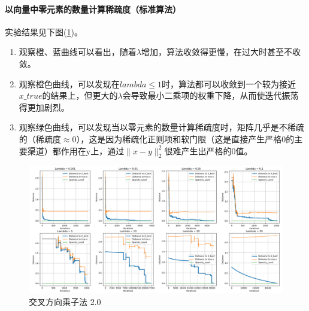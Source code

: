 \documentclass{article}
\begin{document}
\paragraph{以向量中零元素的数量计算稀疏度（标准算法）\\}
实验结果见下图(\ref{fig: img2.0})。\\
\begin{enumerate}
    \item 观察橙、蓝曲线可以看出，随着$\lambda$增加，算法收敛得更慢，在过大时甚至不收敛。
    \item 观察橙色曲线，可以发现在$lambda\leq1$时，算法都可以收敛到一个较为接近$x\_true$的结果上，但更大的$\lambda$会导致最小二乘项的权重下降，从而使迭代振荡得更加剧烈。
    \item 观察绿色曲线，可以发现当以零元素的数量计算稀疏度时，矩阵几乎是不稀疏的（稀疏度$\approx0$），这是因为稀疏化正则项和软门限（这是直接产生严格0的主要渠道）都作用在y上，通过$\|x-y\|_2^2$很难产生出严格的0值。
\end{enumerate}

\begin{figure}[H]
    \centering
    \includegraphics[width=\linewidth]{./images/Figure_2.png}
    \caption{交叉方向乘子法 2.0}
    \label{fig: img2.0}
\end{figure}
\newpage
\end{document}
